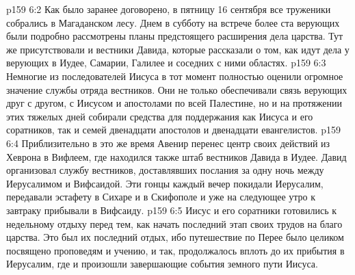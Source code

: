 \vs p159 6:2 Как было заранее договорено, в пятницу 16 сентября все труженики собрались в Магаданском лесу. Днем в субботу на встрече более ста верующих были подробно рассмотрены планы предстоящего расширения дела царства. Тут же присутствовали и вестники Давида, которые рассказали о том, как идут дела у верующих в Иудее, Самарии, Галилее и соседних с ними областях.
\vs p159 6:3 Немногие из последователей Иисуса в тот момент полностью оценили огромное значение службы отряда вестников. Они не только обеспечивали связь верующих друг с другом, с Иисусом и апостолами по всей Палестине, но и на протяжении этих тяжелых дней собирали средства для поддержания как Иисуса и его соратников, так и семей двенадцати апостолов и двенадцати евангелистов.
\vs p159 6:4 Приблизительно в это же время Авенир перенес центр своих действий из Хеврона в Вифлеем, где находился также штаб вестников Давида в Иудее. Давид организовал службу вестников, доставлявших послания за одну ночь между Иерусалимом и Вифсаидой. Эти гонцы каждый вечер покидали Иерусалим, передавали эстафету в Сихаре и в Скифополе и уже на следующее утро к завтраку прибывали в Вифсаиду.
\vs p159 6:5 Иисус и его соратники готовились к недельному отдыху перед тем, как начать последний этап своих трудов на благо царства. Это был их последний отдых, ибо путешествие по Перее было целиком посвящено проповедям и учению, и так, продолжалось вплоть до их прибытия в Иерусалим, где и произошли завершающие события земного пути Иисуса.
